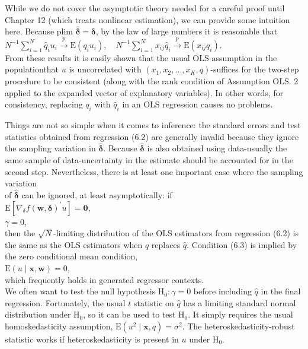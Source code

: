 \documentclass[10pt]{article}
\begin{document}
While we do not cover the asymptotic theory needed for a careful proof until Chapter 12 (which treats nonlinear estimation), we can provide some intuition here. Because plim $\hat{\boldsymbol{\delta}}=\boldsymbol{\delta}$, by the law of large numbers it is reasonable that\\
$N^{-1} \sum_{i=1}^{N} \hat{q}_{i} u_{i} \xrightarrow{p} \mathrm{E}\left(q_{i} u_{i}\right), \quad N^{-1} \sum_{i=1}^{N} x_{i j} \hat{q}_{i} \xrightarrow{p} \mathrm{E}\left(x_{i j} q_{i}\right)$.\\
From these results it is easily shown that the usual OLS assumption in the populationthat $u$ is uncorrelated with $\left(x_{1}, x_{2}, \ldots, x_{K}, q\right)$-suffices for the two-step procedure to be consistent (along with the rank condition of Assumption OLS. 2 applied to the expanded vector of explanatory variables). In other words, for consistency, replacing $q_{i}$ with $\hat{q}_{i}$ in an OLS regression causes no problems.

Things are not so simple when it comes to inference: the standard errors and test statistics obtained from regression (6.2) are generally invalid because they ignore the sampling variation in $\hat{\boldsymbol{\delta}}$. Because $\hat{\boldsymbol{\delta}}$ is also obtained using data-usually the same sample of data-uncertainty in the estimate should be accounted for in the second step. Nevertheless, there is at least one important case where the sampling variation\\
of $\hat{\boldsymbol{\delta}}$ can be ignored, at least asymptotically: if\\
$\mathrm{E}\left[\nabla_{\delta} f(\mathbf{w}, \boldsymbol{\delta})^{\prime} u\right]=\mathbf{0}$,\\
$\gamma=0$,\\
then the $\sqrt{N}$-limiting distribution of the OLS estimators from regression (6.2) is the same as the OLS estimators when $q$ replaces $\hat{q}$. Condition (6.3) is implied by the zero conditional mean condition,\\
$\mathrm{E}(u \mid \mathbf{x}, \mathbf{w})=0$,\\
which frequently holds in generated regressor contexts.\\
We often want to test the null hypothesis $\mathrm{H}_{0}: \gamma=0$ before including $\hat{q}$ in the final regression. Fortunately, the usual $t$ statistic on $\hat{q}$ has a limiting standard normal distribution under $\mathrm{H}_{0}$, so it can be used to test $\mathrm{H}_{0}$. It simply requires the usual homoskedasticity assumption, $\mathrm{E}\left(u^{2} \mid \mathbf{x}, q\right)=\sigma^{2}$. The heteroskedasticity-robust statistic works if heteroskedasticity is present in $u$ under $\mathrm{H}_{0}$.
\end{document}
